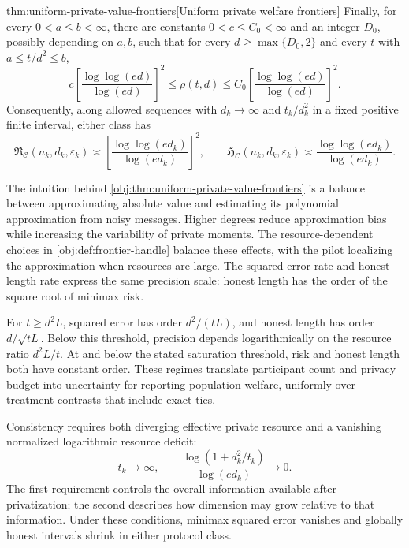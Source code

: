 \begin{theoremv}{thm:uniform-private-value-frontiers}[Uniform private welfare frontiers]
Finally, for every \(0<a\le b<\infty\), there are constants \(0<c\le C_0<\infty\) and an integer \(D_0\), possibly depending on \(a,b\), such that for every \(d\ge\max\{D_0,2\}\) and every \(t\) with \(a\le t/d^2\le b\),
\[
c\left[\frac{\log\log(ed)}{\log(ed)}\right]^2
\le \rho(t,d)\le
C_0\left[\frac{\log\log(ed)}{\log(ed)}\right]^2.
\]
Consequently, along allowed sequences with \(d_k\to\infty\) and \(t_k/d_k^2\) in a fixed positive finite interval, either class has
\[
\mathfrak R_{\mathcal C}(n_k,d_k,\varepsilon_k)
\asymp
\left[\frac{\log\log(ed_k)}{\log(ed_k)}\right]^2,
\qquad
\mathfrak H_{\mathcal C}(n_k,d_k,\varepsilon_k)
\asymp
\frac{\log\log(ed_k)}{\log(ed_k)}.
\]
\end{theoremv}

The intuition behind \cref{obj:thm:uniform-private-value-frontiers} is a balance between approximating absolute value and estimating its polynomial approximation from noisy messages. Higher degrees reduce approximation bias while increasing the variability of private moments. The resource-dependent choices in \cref{obj:def:frontier-handle} balance these effects, with the pilot localizing the approximation when resources are large. The squared-error rate  and honest-length rate  express the same precision scale: honest length has the order of the square root of minimax risk.

For \(t\ge d^2L\), squared error has order \(d^2/(tL)\), and honest length has order \(d/\sqrt{tL}\). Below this threshold, precision depends logarithmically on the resource ratio \(d^2L/t\). At and below the stated saturation threshold, risk and honest length both have constant order. These regimes translate participant count and privacy budget into uncertainty for reporting population welfare, uniformly over treatment contrasts that include exact ties.

Consistency requires both diverging effective private resource and a vanishing normalized logarithmic resource deficit:
\[
t_k\longrightarrow\infty,
\qquad
\frac{\log(1+d_k^2/t_k)}{\log(ed_k)}\longrightarrow0.
\]
The first requirement controls the overall information available after privatization; the second describes how dimension may grow relative to that information. Under these conditions, minimax squared error vanishes and globally honest intervals shrink in either protocol class.

